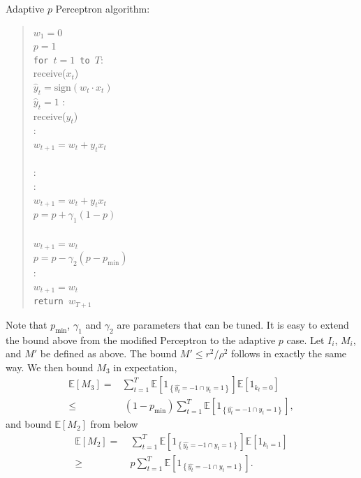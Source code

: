 \documentclass[12pt]{article}
\newcommand{\E}[0]{\mathbb{E}}
\begin{document}
\noindent Adaptive $p$ Perceptron algorithm:
\begin{quotation}
\noindent $w_1=0$\\
\noindent $p=1$\\
{\tt for $t=1$ to $T$}:\\
\indent receive($x_t$)\\
\indent $\widehat{y}_t=\mbox{sign}(w_t\cdot x_t)$\\
 $\widehat{y}_t =1$ : \\
\indent\indent receive($y_t$)\\
\indent{}:\\
\indent\indent\indent $w_{t+1} = w_t + y_t x_t$\\
\indent{}\\
:\\
\indent{}:\\
\indent\indent\indent $w_{t+1} = w_t + y_t x_t$\\
\indent\indent\indent $p=p + \gamma_1(1 - p)$\\
\indent{}\\
\indent\indent\indent $w_{t+1} = w_t$\\
\indent\indent\indent $p = p - \gamma_2(p - p_{\min})$\\
:\\
\indent\indent $w_{t+1} = w_t$\\
{\tt return $w_{T+1}$}
\end{quotation}
Note that $p_{\min}$, $\gamma_1$ and $\gamma_2$ are parameters that can be tuned. It is easy to extend the bound above from the modified Perceptron to the adaptive $p$ case.  Let $I_i$, $M_i$, and $M'$ be defined as above. The bound $M'\leq r^2/\rho^2$ follows in exactly the same way.  We then bound $M_3$ in expectation, 
\begin{align*}
\E[M_3] = & \sum_{t=1}^T \E[1_{\left\{\widehat{y_t} = -1 \cap y_t = 1\right\}}]\E[1_{k_t = 0}] \\
 \leq &\ (1 - p_{\min})\sum_{t=1}^T \E[1_{\left\{\widehat{y_t} = -1 \cap y_t = 1\right\}}],
\end{align*}
and bound $\E[M_2]$ from below
\begin{align*}
\E[M_2] =&\ \sum_{t=1}^T \E[1_{\left\{\hat{y_t} = -1 \cap y_t = 1\right\}}]\E[1_{k_t = 1}] \\
\geq &\ p\sum_{t=1}^T \E[1_{\left\{\hat{y_t} = -1 \cap y_t = 1\right\}}].
\end{align*}
\end{document}
